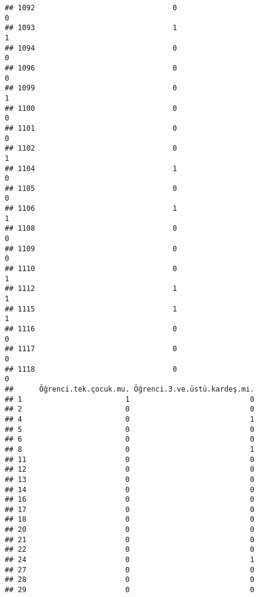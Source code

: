 \documentclass[
]{article}
\begin{document}
\begin{verbatim}
## 1092                                0                                0
## 1093                                1                                1
## 1094                                0                                0
## 1096                                0                                0
## 1099                                0                                1
## 1100                                0                                0
## 1101                                0                                0
## 1102                                0                                1
## 1104                                1                                0
## 1105                                0                                0
## 1106                                1                                1
## 1108                                0                                0
## 1109                                0                                0
## 1110                                0                                1
## 1112                                1                                1
## 1115                                1                                1
## 1116                                0                                0
## 1117                                0                                0
## 1118                                0                                0
##      Öğrenci.tek.çocuk.mu. Öğrenci.3.ve.üstü.kardeş.mi.
## 1                        1                            0
## 2                        0                            0
## 4                        0                            1
## 5                        0                            0
## 6                        0                            0
## 8                        0                            1
## 11                       0                            0
## 12                       0                            0
## 13                       0                            0
## 14                       0                            0
## 16                       0                            0
## 17                       0                            0
## 18                       0                            0
## 20                       0                            0
## 21                       0                            0
## 22                       0                            0
## 24                       0                            1
## 27                       0                            0
## 28                       0                            0
## 29                       0                            0

\end{verbatim}
\end{document}
